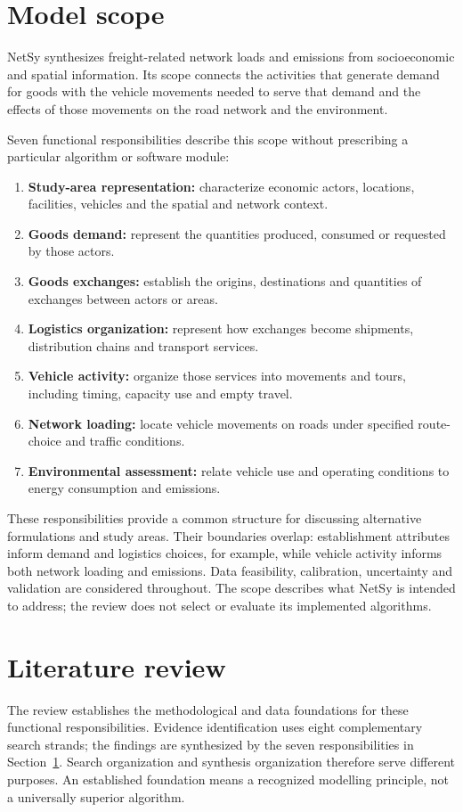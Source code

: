 \section{Model scope}\label{sec:scope}
NetSy synthesizes freight-related network loads and emissions from socioeconomic
and spatial information. Its scope connects the activities that generate demand
for goods with the vehicle movements needed to serve that demand and the effects
of those movements on the road network and the environment.

Seven functional responsibilities describe this scope without prescribing a
particular algorithm or software module:
\begin{enumerate}
\item \textbf{Study-area representation:} characterize economic actors,
locations, facilities, vehicles and the spatial and network context.
\item \textbf{Goods demand:} represent the quantities produced, consumed or
requested by those actors.
\item \textbf{Goods exchanges:} establish the origins, destinations and quantities
of exchanges between actors or areas.
\item \textbf{Logistics organization:} represent how exchanges become shipments,
distribution chains and transport services.
\item \textbf{Vehicle activity:} organize those services into movements and tours,
including timing, capacity use and empty travel.
\item \textbf{Network loading:} locate vehicle movements on roads under specified
route-choice and traffic conditions.
\item \textbf{Environmental assessment:} relate vehicle use and operating
conditions to energy consumption and emissions.
\end{enumerate}
These responsibilities provide a common structure for discussing alternative
formulations and study areas. Their boundaries overlap: establishment attributes
inform demand and logistics choices, for example, while vehicle activity informs
both network loading and emissions. Data feasibility, calibration, uncertainty
and validation are considered throughout. The scope describes what NetSy is
intended to address; the review does not select or evaluate its implemented
algorithms.

\section{Literature review}\label{sec:slr}
The review establishes the methodological and data foundations for these
functional responsibilities. Evidence identification uses eight complementary
search strands; the findings are synthesized by the seven responsibilities in
Section~\ref{sec:scope}. Search organization and synthesis organization therefore
serve different purposes. An established foundation means a recognized modelling
principle, not a universally superior algorithm.


